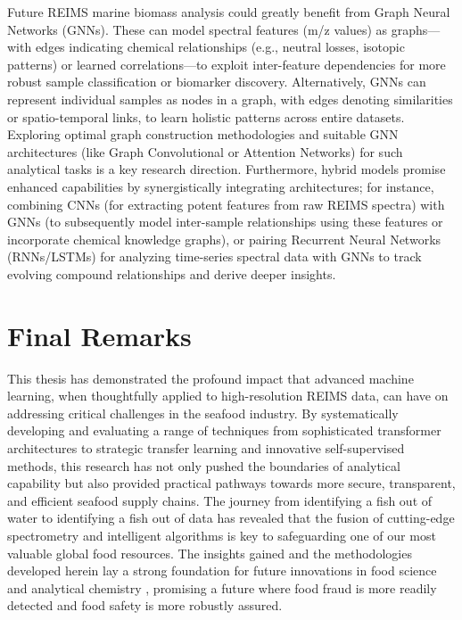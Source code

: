 Future REIMS marine biomass analysis could greatly benefit from Graph Neural Networks (GNNs). These can model spectral features (m/z values) as graphs—with edges indicating chemical relationships (e.g., neutral losses, isotopic patterns) or learned correlations—to exploit inter-feature dependencies for more robust sample classification or biomarker discovery. Alternatively, GNNs can represent individual samples as nodes in a graph, with edges denoting similarities or spatio-temporal links, to learn holistic patterns across entire datasets. Exploring optimal graph construction methodologies and suitable GNN architectures (like Graph Convolutional or Attention Networks) for such analytical tasks is a key research direction. Furthermore, hybrid models promise enhanced capabilities by synergistically integrating architectures; for instance, combining CNNs (for extracting potent features from raw REIMS spectra) with GNNs (to subsequently model inter-sample relationships using these features or incorporate chemical knowledge graphs), or pairing Recurrent Neural Networks (RNNs/LSTMs) for analyzing time-series spectral data with GNNs to track evolving compound relationships and derive deeper insights.

\section{Final Remarks}

This thesis has demonstrated the profound impact that advanced machine learning, when thoughtfully applied to high-resolution REIMS data, can have on addressing critical challenges in the seafood industry. By systematically developing and evaluating a range of techniques from sophisticated transformer architectures to strategic transfer learning and innovative self-supervised methods, this research has not only pushed the boundaries of analytical capability but also provided practical pathways towards more secure, transparent, and efficient seafood supply chains. The journey from identifying a fish out of water to identifying a fish out of data has revealed that the fusion of cutting-edge spectrometry and intelligent algorithms is key to safeguarding one of our most valuable global food resources. The insights gained and the methodologies developed herein lay a strong foundation for future innovations in food science and analytical chemistry \citep{Xue2025}, promising a future where food fraud is more readily detected and food safety is more robustly assured.
